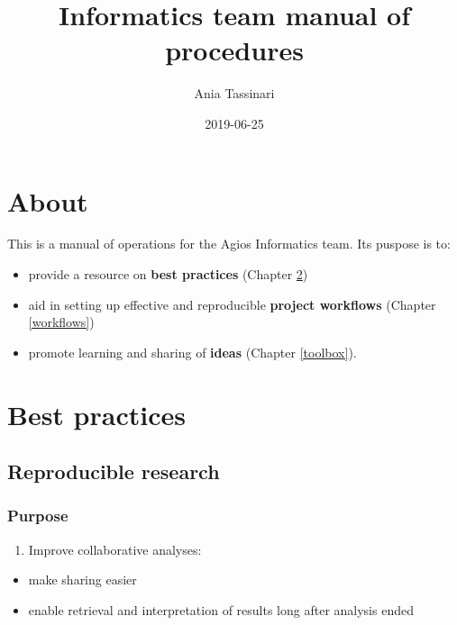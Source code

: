 \documentclass[]{book}
\title{Informatics team manual of procedures}
\author{Ania Tassinari}
\date{2019-06-25}
\providecommand{\tightlist}{%
  \setlength{\itemsep}{0pt}\setlength{\parskip}{0pt}}
\begin{document}
\maketitle

{
\setcounter{tocdepth}{1}
\tableofcontents
}
\hypertarget{about}{%
\chapter{About}\label{about}}

This is a manual of operations for the Agios Informatics team. Its puspose is to:

\begin{itemize}
\tightlist
\item
  provide a resource on \textbf{best practices} (Chapter \ref{bestpractices})
\item
  aid in setting up effective and reproducible \textbf{project workflows} (Chapter \ref{workflows})
\item
  promote learning and sharing of \textbf{ideas} (Chapter \ref{toolbox}).
\end{itemize}

\hypertarget{bestpractices}{%
\chapter{Best practices}\label{bestpractices}}

\hypertarget{reproducible-research}{%
\section{Reproducible research}\label{reproducible-research}}

\hypertarget{purpose}{%
\subsection{Purpose}\label{purpose}}

\begin{enumerate}
\def\labelenumi{\arabic{enumi}.}
\tightlist
\item
  Improve collaborative analyses:
\end{enumerate}

\begin{itemize}
\tightlist
\item
  make sharing easier
\item
  enable retrieval and interpretation of results long after analysis ended
\end{itemize}
\end{document}
